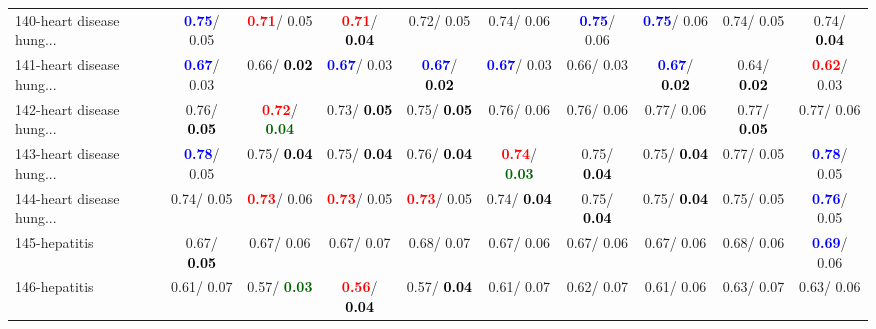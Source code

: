 \begin{table}[h]
\begin{center}
{\begin{tabular}{lc|c|c|c|c|c|c|c|c}
140-heart disease hung... & \textcolor{blue}{\textbf{  0.75}}/  0.05 & \textcolor{red}{\textbf{  0.71}}/  0.05 & \textcolor{red}{\textbf{  0.71}}/\textcolor{black}{\textbf{  0.04}} &   0.72/  0.05 &   0.74/  0.06 & \textcolor{blue}{\textbf{  0.75}}/  0.06 & \textcolor{blue}{\textbf{  0.75}}/  0.06 &   0.74/  0.05 &   0.74/\textcolor{black}{\textbf{  0.04}} \\
141-heart disease hung... & \textcolor{blue}{\textbf{  0.67}}/  0.03 &   0.66/\textcolor{black}{\textbf{  0.02}} & \textcolor{blue}{\textbf{  0.67}}/  0.03 & \textcolor{blue}{\textbf{  0.67}}/\textcolor{black}{\textbf{  0.02}} & \textcolor{blue}{\textbf{  0.67}}/  0.03 &   0.66/  0.03 & \textcolor{blue}{\textbf{  0.67}}/\textcolor{black}{\textbf{  0.02}} &   0.64/\textcolor{black}{\textbf{  0.02}} & \textcolor{red}{\textbf{  0.62}}/  0.03 \\
142-heart disease hung... &   0.76/\textcolor{black}{\textbf{  0.05}} & \textcolor{red}{\textbf{  0.72}}/\textcolor{darkgreen}{\textbf{  0.04}} &   0.73/\textcolor{black}{\textbf{  0.05}} &   0.75/\textcolor{black}{\textbf{  0.05}} &   0.76/  0.06 &   0.76/  0.06 &   0.77/  0.06 &   0.77/\textcolor{black}{\textbf{  0.05}} &   0.77/  0.06 \\ \hline
143-heart disease hung... & \textcolor{blue}{\textbf{  0.78}}/  0.05 &   0.75/\textcolor{black}{\textbf{  0.04}} &   0.75/\textcolor{black}{\textbf{  0.04}} &   0.76/\textcolor{black}{\textbf{  0.04}} & \textcolor{red}{\textbf{  0.74}}/\textcolor{darkgreen}{\textbf{  0.03}} &   0.75/\textcolor{black}{\textbf{  0.04}} &   0.75/\textcolor{black}{\textbf{  0.04}} &   0.77/  0.05 & \textcolor{blue}{\textbf{  0.78}}/  0.05 \\
144-heart disease hung... &   0.74/  0.05 & \textcolor{red}{\textbf{  0.73}}/  0.06 & \textcolor{red}{\textbf{  0.73}}/  0.05 & \textcolor{red}{\textbf{  0.73}}/  0.05 &   0.74/\textcolor{black}{\textbf{  0.04}} &   0.75/\textcolor{black}{\textbf{  0.04}} &   0.75/\textcolor{black}{\textbf{  0.04}} &   0.75/  0.05 & \textcolor{blue}{\textbf{  0.76}}/  0.05 \\
145-hepatitis &   0.67/\textcolor{black}{\textbf{  0.05}} &   0.67/  0.06 &   0.67/  0.07 &   0.68/  0.07 &   0.67/  0.06 &   0.67/  0.06 &   0.67/  0.06 &   0.68/  0.06 & \textcolor{blue}{\textbf{  0.69}}/  0.06 \\
146-hepatitis &   0.61/  0.07 &   0.57/\textcolor{darkgreen}{\textbf{  0.03}} & \textcolor{red}{\textbf{  0.56}}/\textcolor{black}{\textbf{  0.04}} &   0.57/\textcolor{black}{\textbf{  0.04}} &   0.61/  0.07 &   0.62/  0.07 &   0.61/  0.06 &   0.63/  0.07 &   0.63/  0.06 \\

\end{tabular}}
\end{center}
\end{table}
